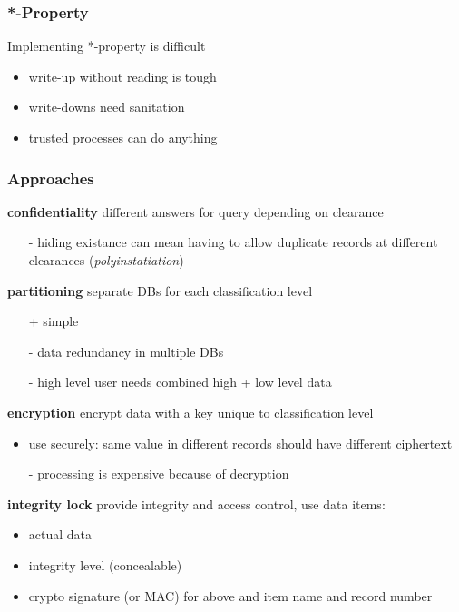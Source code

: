 \documentclass[]{article}
\theoremstyle{definition}
\begin{document}
	\subsubsection{*-Property}
	Implementing *-property is difficult
	\begin{itemize}
		\item write-up without reading is tough
		\item write-downs need sanitation
		\item trusted processes can do anything
	\end{itemize}

	\subsubsection{Approaches}
	\textbf{confidentiality} different answers for query depending on clearance
	\begin{itemize}
		\item[-] hiding existance can mean having to allow duplicate records at different clearances (\textit{polyinstatiation})
	\end{itemize}

	\textbf{partitioning} separate DBs for each classification level
	\begin{itemize}
		\item[+] simple
		\item[-] data redundancy in multiple DBs
		\item[-] high level user needs combined high + low level data
	\end{itemize}

	\textbf{encryption} encrypt data with a key unique to classification level
	\begin{itemize}
		\item use securely: same value in different records should have different ciphertext
		\item[-] processing is expensive because of decryption
	\end{itemize}

	\textbf{integrity lock} provide integrity and access control, use data items:
	\begin{itemize}
		\item actual data
		\item integrity level (concealable)
		\item crypto signature (or MAC) for above and item name and record number
	\end{itemize}
\end{document}
